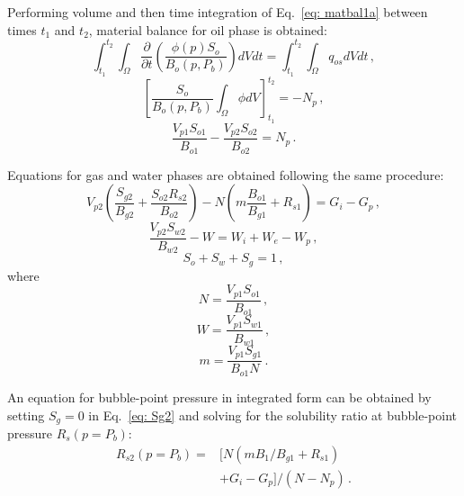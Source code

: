 \documentclass[authoryear,preprint,review,12pt]{elsarticle}
\begin{document}
Performing volume and then time integration of Eq.~\eqref{eq: matbal1a} between times $t_1$ and $t_2$, material balance for oil phase is obtained:
\begin{equation}
\int_{t_1}^{t_2}\int_{\Omega} \frac{\partial}{\partial t}\left(\frac{\phi(p) S_o}{B_o(p,P_b)}\right) dV dt = \int_{t_1}^{t_2}\int_{\Omega} q_{os} dV dt\, ,
\end{equation}
\begin{equation}
\left[ \frac{S_o}{B_o(p,P_b)} \int_{\Omega}\phi dV \right]^{t_2}_{t_1} = -N_p \, ,
\end{equation}
\begin{equation}\label{eq: So5}
\frac{V_{p1} S_{o1}}{B_{o1}}-\frac{V_{p2}S_{o2}}{B_{o2}} = N_p \, .
\end{equation}

Equations for gas and water phases are obtained following the same procedure:
\begin{equation}\label{eq: Sg5}
V_{p2}\left(\frac{S_{g2}}{B_{g2}} +\frac{S_{o2} R_{s2}}{B_{o2}}\right) - N\left(m\frac{B_{o1}}{B_{g1}} + R_{s1}\right)=G_i-G_p \, ,
\end{equation}
\begin{equation}\label{eq: Sw5}
\frac{V_{p2} S_{w2}}{B_{w2}} - W=W_i+W_e-W_p \, ,
\end{equation}
%
\begin{equation}\label{eq: S15}
S_o+S_w+S_g=1 \, ,
\end{equation}
where
\begin{equation}
N=\frac{V_{p1} S_{o1}}{B_{o1}} \, ,
\end{equation}
\begin{equation}
W=\frac{V_{p1} S_{w1}}{B_{w1}} \, ,
\end{equation}
\begin{equation}
m=\frac{V_{p1} S_{g1}}{B_{o1} N} \, .
\end{equation}

An equation for bubble-point pressure in integrated form can be obtained by setting $S_g=0$ in Eq.~\eqref{eq: Sg2} and solving for the solubility ratio at bubble-point pressure $R_s(p=P_b)$:
\begin{equation}
\begin{split}
R_{s2}\left(p=P_b\right) = &\Big[N\left(m B_{1}/B_{g1} +R_{s1}\right)\\
&+G_i-G_p\Big]/\left(N-N_p\right) \, .
\end{split}
\end{equation}
\end{document}
